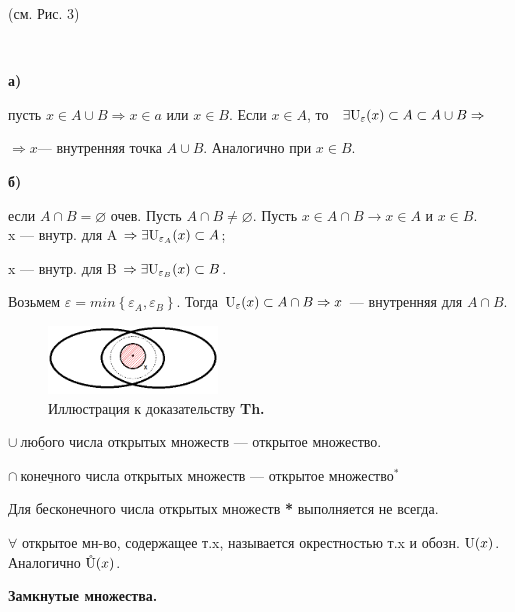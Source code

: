 \Proof (см. Рис. 3)

~~ \parbox[t]{0.95\linewidth}{
	\textbf{а)} 
	\parbox[t]{0.95\linewidth}{
		пусть $x \in A \cup B \Rightarrow x \in a \text{ или } x \in B$. Если $x \in A$, то \ $					\exists \Ue(x) \subset A \subset A \cup B \Rightarrow $

		$ \Rightarrow x \text {--- внутренняя точка } A \cup B$. Аналогично при $x \in B$.
	}

	\textbf{б)} 
	\parbox[t]{0.95\linewidth}{
		если $A \cap B = \varnothing$ очев. Пусть $A \cap B \neq \varnothing$. Пусть $x \in 				A \cap B \rightarrow x \in A$ и $x\in B$.  \\ x --- внутр. для A $\Rightarrow \exists 					\U_{\varepsilon_A}(x) \subset A$; 

		x --- внутр. для B $\Rightarrow \exists \U_{\varepsilon_B}	(x) \subset B$. 
		
		Возьмем 	$ \varepsilon = min \left\{ \varepsilon_A, \varepsilon_B \right\}$.  Тогда $\Ue(x) 			\subset A \cap B \Rightarrow x$ --- внутренняя для $A \cap B$. \Endproof
	}
	
}

\newpage 

\begin{figure}[h]
	\begin{center}
	    \includegraphics[width=0.4\textwidth]{4.png}
	  \end{center}
	\caption{Иллюстрация к доказательству \textbf{Th.} }
\end{figure}

\Consequence{} \parbox[t]{0.95\linewidth}{$\cup \ \underline{\text{любого}}$ числа открытых множеств --- открытое множество.

$\cap \ \underline{\text{конечного}}$ числа открытых множеств --- открытое множество$^{ \textbf{*}}$}

\Note Для бесконечного числа открытых множеств \textbf{*} выполняется не всегда.

\Def $\forall$ открытое мн-во, содержащее т.x, называется окрестностью т.x и обозн. $\U(x)$. Аналогично $\Uo(x)$. \textcolor{red}{\fbox{!}}

\smallskip

 \textbf{Замкнутые множества.}

